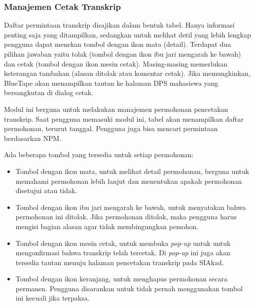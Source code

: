 \subsubsection{Manajemen Cetak Transkrip}
\label{sec:bluetape_manajemen_cetak_transkrip}
Daftar permintaan transkrip disajikan dalam bentuk tabel. Hanya informasi penting saja yang ditampilkan, sedangkan untuk melihat detil yang lebih lengkap pengguna dapat menekan tombol dengan ikon mata (detail). Terdapat dua pilihan jawaban yaitu tolak (tombol dengan ikon ibu jari mengarah ke bawah) dan cetak (tombol dengan ikon mesin cetak). Masing-masing memerlukan keterangan tambahan (alasan ditolak atau komentar cetak). Jika memungkinkan, BlueTape akan menampilkan tautan ke halaman DPS mahasiswa yang bersangkutan di dialog cetak.

Modul ini berguna untuk melakukan manajemen permohonan pencetakan transkrip. Saat pengguna memasuki modul ini, tabel akan menampilkan daftar permohonan, terurut tanggal. Pengguna juga bisa mencari permintaan berdasarkan NPM.

Ada beberapa tombol yang tersedia untuk setiap permohonan:
\begin{itemize}
	\item Tombol dengan ikon mata, untuk melihat detail permohonan, berguna untuk memahami permohonan lebih lanjut dan menentukan apakah permohonan disetujui atau tidak.
	\item Tombol dengan ikon ibu jari mengarah ke bawah, untuk menyatakan bahwa permohonan ini ditolak. Jika permohonan ditolak, maka pengguna harus mengisi bagian alasan agar tidak membingungkan pemohon.
	\item Tombol dengan ikon mesin cetak, untuk membuka \textit{pop-up} untuk untuk mengonfirmasi bahwa transkrip telah tercetak. Di \textit{pop-up} ini juga akan tersedia tautan menuju halaman pencetakan transkrip pada SIAkad.
	\item Tombol dengan ikon keranjang, untuk menghapus permohonan secara permanen. Pengguna disarankan untuk tidak pernah menggunakan tombol ini kecuali jika terpaksa.
\end{itemize} 
